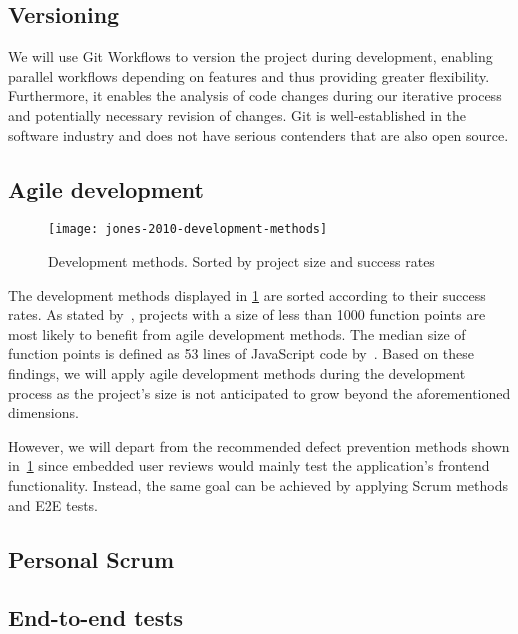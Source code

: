 \subsection{Versioning}\label{subsec:versioning}

We will use Git Workflows to version the project during development, enabling parallel workflows depending on features and thus providing greater flexibility.
Furthermore, it enables the analysis of code changes during our iterative process and potentially necessary revision of changes.
Git is well-established in the software industry and does not have serious contenders that are also open source.

\subsection{Agile development}\label{subsec:agile-development}

\begin{figure}[t]
    \centering
    \texttt{[image: jones-2010-development-methods]}
    \caption[Development mehtods]{Development methods. Sorted by project size and success rates~\autocite[11]{jones_software_2010}}
    \label{fig:development-methods}
\end{figure}

The development methods displayed in \cref{fig:development-methods} are sorted according to their success rates.
As stated by~\textcite[10-12]{jones_software_2010}, projects with a size of less than 1000 function points are most likely to benefit from agile development methods.
The median size of function points is defined as 53 lines of JavaScript code by~\textcite{qsm_function_2009}.
Based on these findings, we will apply agile development methods during the development process as the project's size is not anticipated to grow beyond the aforementioned dimensions.

However, we will depart from the recommended defect prevention methods shown in~\cref{fig:development-methods} since embedded user reviews would mainly test the application’s frontend functionality.
Instead, the same goal can be achieved by applying Scrum methods and \gls{E2E} tests.

\subsection{Personal Scrum}\label{subsec:personal-scrum}

\subsection{End-to-end tests}\label{subsec:end-to-end-tests}

